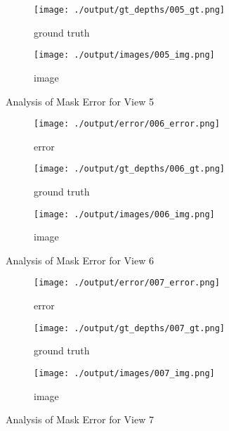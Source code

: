 \documentclass{article}
\begin{document}
\begin{figure}
	\hfill
	\centering
	\begin{subfigure}{0.3\textwidth}
		\centering
		\texttt{[image: ./output/gt\_depths/005\_gt.png]}
		\caption{ground truth}
		\label{fig:gt5}
	\end{subfigure}
	\hfill
	\centering
	\begin{subfigure}{0.3\textwidth}
		\centering
		\texttt{[image: ./output/images/005\_img.png]}
		\caption{image}
		\label{fig:img5}
	\end{subfigure}
	\hfill
	\caption{Analysis of Mask Error for View 5}
	\label{fig:error_analys5}
\end{figure}\begin{figure}
	\centering
	\begin{subfigure}{0.3\textwidth}
		\centering
		\texttt{[image: ./output/error/006\_error.png]}
		\caption{error}
		\label{fig:error6}
	\end{subfigure}
	\hfill
	\centering
	\begin{subfigure}{0.3\textwidth}
		\centering
		\texttt{[image: ./output/gt\_depths/006\_gt.png]}
		\caption{ground truth}
		\label{fig:gt6}
	\end{subfigure}
	\hfill
	\centering
	\begin{subfigure}{0.3\textwidth}
		\centering
		\texttt{[image: ./output/images/006\_img.png]}
		\caption{image}
		\label{fig:img6}
	\end{subfigure}
	\hfill
	\caption{Analysis of Mask Error for View 6}
	\label{fig:error_analys6}
\end{figure}\begin{figure}
	\centering
	\begin{subfigure}{0.3\textwidth}
		\centering
		\texttt{[image: ./output/error/007\_error.png]}
		\caption{error}
		\label{fig:error7}
	\end{subfigure}
	\hfill
	\centering
	\begin{subfigure}{0.3\textwidth}
		\centering
		\texttt{[image: ./output/gt\_depths/007\_gt.png]}
		\caption{ground truth}
		\label{fig:gt7}
	\end{subfigure}
	\hfill
	\centering
	\begin{subfigure}{0.3\textwidth}
		\centering
		\texttt{[image: ./output/images/007\_img.png]}
		\caption{image}
		\label{fig:img7}
	\end{subfigure}
	\hfill
	\caption{Analysis of Mask Error for View 7}
	\label{fig:error_analys7}

\end{figure}
\end{document}
